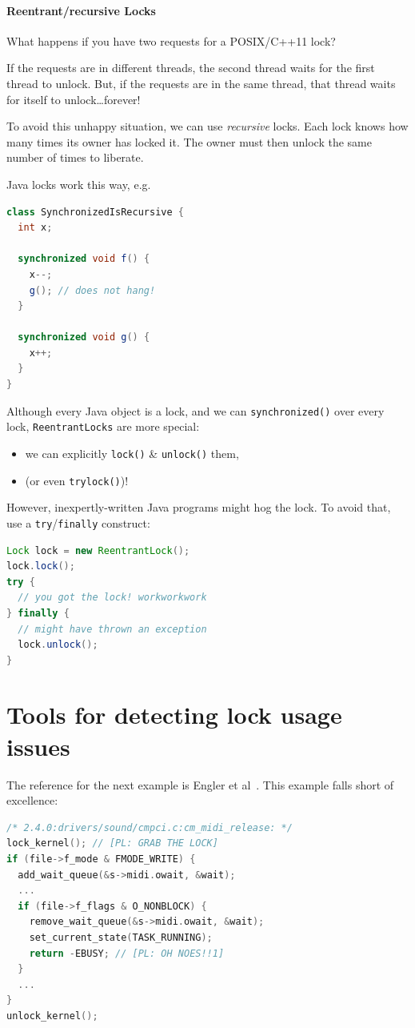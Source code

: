 \documentclass[11pt]{article}
\begin{document}
\paragraph{Reentrant/recursive Locks}
What happens if you have two requests for a POSIX/C++11 lock?

If the requests are in different threads, the second thread waits for the first thread to unlock.
But, if the requests are in the same thread, that thread waits for itself to unlock\ldots forever!

To avoid this unhappy situation, we can use \emph{recursive} locks.
Each lock knows how many times its owner has locked it. The owner must
then unlock the same number of times to liberate.

Java locks work this way, e.g.
\begin{lstlisting}[language=java]
class SynchronizedIsRecursive {
  int x;

  synchronized void f() {
    x--;
    g(); // does not hang!
  }

  synchronized void g() {
    x++;
  }
}
\end{lstlisting}

Although every Java object is a lock, and we can {\tt synchronized()} over every lock,
{\tt ReentrantLocks} are more special:

    \begin{itemize}
    \item we can explicitly {\tt lock()} \& {\tt unlock()} them,
    \item (or even {\tt trylock()})!
    \end{itemize}

However, inexpertly-written Java programs might hog the lock. To avoid that,
use a {\tt try}/{\tt finally} construct:
    \begin{lstlisting}[language=Java]
Lock lock = new ReentrantLock();
lock.lock();
try {
  // you got the lock! workworkwork
} finally {
  // might have thrown an exception
  lock.unlock();
}
\end{lstlisting}

\section*{Tools for detecting lock usage issues}
The reference for the next example is Engler et al~\cite{EnglerETAL00CheckingSystemRulesUsingSystemspecificProgrammerwritten}.
This example falls short of excellence:

\begin{lstlisting}[language=C,commentstyle={\color{red}\bf}]
/* 2.4.0:drivers/sound/cmpci.c:cm_midi_release: */
lock_kernel(); // [PL: GRAB THE LOCK]
if (file->f_mode & FMODE_WRITE) {
  add_wait_queue(&s->midi.owait, &wait);
  ...
  if (file->f_flags & O_NONBLOCK) {
    remove_wait_queue(&s->midi.owait, &wait);
    set_current_state(TASK_RUNNING);
    return -EBUSY; // [PL: OH NOES!!1]
  }
  ...
}
unlock_kernel();
\end{lstlisting}
\end{document}
